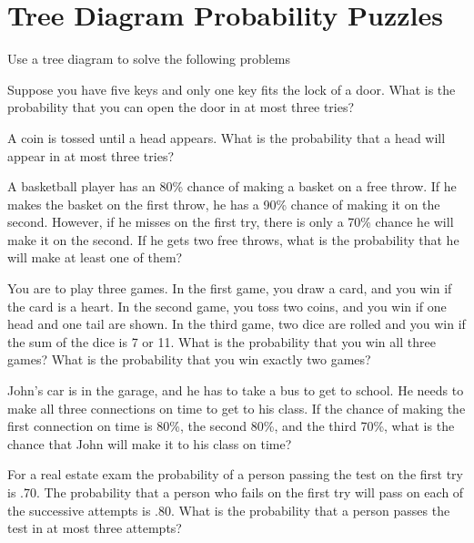\section{Tree Diagram Probability Puzzles}

Use a tree diagram to solve the following problems

\begin{puzzle}
    Suppose you have five keys and only one key fits the lock of a door. What is the probability that you can open the door in at most three tries?
\end{puzzle}

\begin{puzzle}
    A coin is tossed until a head appears. What is the probability that a head will appear in at most three tries?
\end{puzzle}

\begin{puzzle}
    A basketball player has an 80\% chance of making a basket on a free throw. If he makes the basket on the first throw, he has a 90\% chance of making it on the second. However, if he misses on the first try, there is only a 70\% chance he will make it on the second. If he gets two free throws, what is the probability that he will make at least one of them?
\end{puzzle}

\begin{puzzle}
    You are to play three games. In the first game, you draw a card, and you win if the card is a heart. In the second game, you toss two coins, and you win if one head and one tail are shown. In the third game, two dice are rolled and you win if the sum of the dice is 7 or 11. What is the probability that you win all three games? What is the probability that you win exactly two games?
\end{puzzle}

\begin{puzzle}
    John's car is in the garage, and he has to take a bus to get to school. He needs to make all three connections on time to get to his class. If the chance of making the first connection on time is 80\%, the second 80\%, and the third 70\%, what is the chance that John will make it to his class on time?
\end{puzzle}

\begin{puzzle}
    For a real estate exam the probability of a person passing the test on the first try is .70. The probability that a person who fails on the first try will pass on each of the successive attempts is .80. What is the probability that a person passes the test in at most three attempts?
\end{puzzle}

